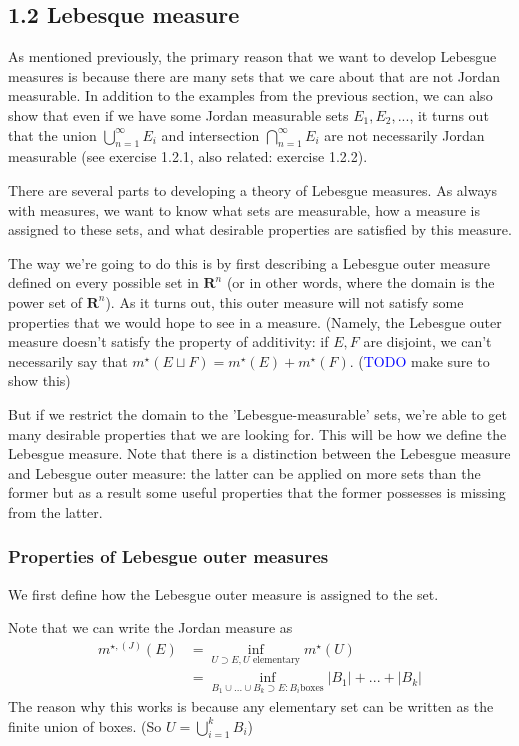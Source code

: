 \documentclass[answers,12pt]{exam}
\begin{document}
\subsection{1.2 Lebesque measure}
As mentioned previously, the primary reason that we want to develop Lebesgue measures is because there are many sets that we care about that are not Jordan measurable.
In addition to the examples from the previous section, we can also show that even if we have some Jordan measurable sets $E_1,E_2, ...$, it turns out that the union $\bigcup_{n=1}^{\infty} E_i$ and intersection $\bigcap_{n=1}^{\infty} E_i$ are not necessarily Jordan measurable (see exercise 1.2.1, also related: exercise 1.2.2). 

There are several parts to developing a theory of Lebesgue measures.
As always with measures, we want to know what sets are measurable, how a measure is assigned to these sets, and what desirable properties are satisfied by this measure.

The way we're going to do this is by first describing a Lebesgue outer measure defined on every possible set in $\mathbf{R}^n$ (or in other words, where the domain is the power set of $\mathbf{R}^n$).
As it turns out, this outer measure will not satisfy some properties that we would hope to see in a measure.
(Namely, the Lebesgue outer measure doesn't satisfy the property of additivity: if $E,F$ are disjoint, we can't necessarily say that $m^{\star}(E \sqcup F) = m^{\star}(E) + m^{\star}(F)$. (\textcolor{blue}{TODO} make sure to show this)

But if we restrict the domain to the 'Lebesgue-measurable' sets, we're able to get many desirable properties that we are looking for.
This will be how we define the Lebesgue measure.
Note that there is a distinction between the Lebesgue measure and Lebesgue outer measure: the latter can be applied on more sets than the former but as a result some useful properties that the former possesses is missing from the latter.

\subsubsection{Properties of Lebesgue outer measures}
We first define how the Lebesgue outer measure is assigned to the set.

Note that we can write the Jordan measure as 
\[
    \begin{aligned}
        m^{\star,(J)}(E) &= \inf_{U \supset E, U \text{ elementary}} m^{\star}(U)\\
        &= \inf_{B_1\cup...\cup B_k \supset E: B_i \text{boxes}}|B_1|+...+|B_k|
    \end{aligned}  
\]
The reason why this works is because any elementary set can be written as the finite union of boxes.
(So $U = \bigcup_{i=1}^k B_i$)
\end{document}
